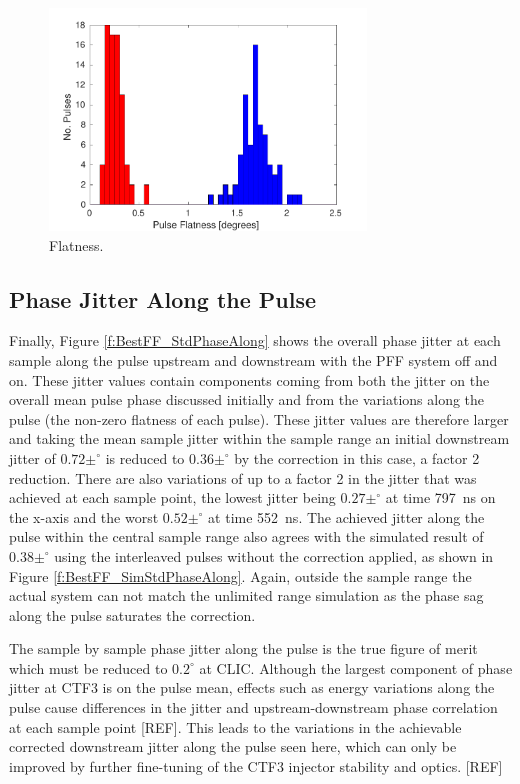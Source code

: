 \begin{figure}
  \centering
  \includegraphics[width=0.75\textwidth]{Figures/feedforward/BestFF_Flatness}
  \caption{Flatness.}
  \label{f:BestFF_Flatness}
\end{figure}

\subsection{Phase Jitter Along the Pulse}
\label{ss:bestJitterAlong}

Finally, Figure \ref{f:BestFF_StdPhaseAlong} shows the overall phase jitter at each 
sample along the pulse upstream and downstream with the PFF system off and on. These 
jitter values contain components coming from both the jitter on the overall mean pulse 
phase discussed initially and from the variations along the pulse (the non-zero flatness of each pulse). These jitter values are therefore larger and taking the mean sample 
jitter within the sample range an initial downstream jitter of \(0.72\pm^\circ\) is 
reduced to \(0.36\pm^\circ\) by the correction in this case, a factor 2 reduction. There are also variations of up to a factor 2 in the jitter that was achieved at each sample 
point, the lowest jitter being \(0.27\pm^\circ\) at time 797~ns on the x-axis and the 
worst \(0.52\pm^\circ\) at time 552~ns. The achieved jitter along the pulse within the 
central sample range also agrees with the simulated result of \(0.38\pm^\circ\) using 
the interleaved pulses without the correction applied, as shown in Figure 
\ref{f:BestFF_SimStdPhaseAlong}. Again, outside the sample range the actual system can 
not match the unlimited range simulation as the phase sag along the pulse saturates the 
correction. 


The sample by sample phase jitter along the pulse is the true figure of merit which must be reduced to \(0.2^\circ\) at CLIC. Although the largest component of phase jitter at 
CTF3 is on the pulse mean, effects such as energy variations along the pulse cause 
differences in the jitter and upstream-downstream phase correlation at each sample point [REF]. This leads to the variations in the achievable corrected downstream jitter along 
the pulse seen here, which can only be improved by further fine-tuning of the CTF3 
injector stability and optics. [REF]

